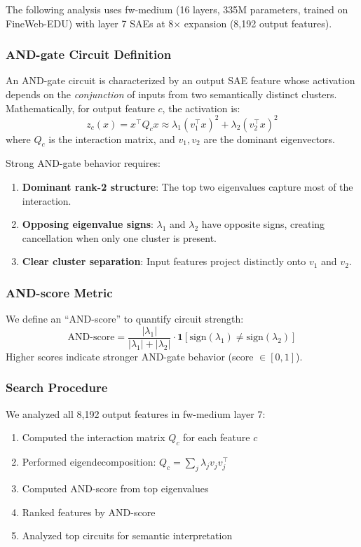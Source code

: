 The following analysis uses fw-medium (16 layers, 335M parameters, trained on FineWeb-EDU) with layer 7 SAEs at 8$\times$ expansion (8,192 output features).

\subsubsection{AND-gate Circuit Definition}
An AND-gate circuit is characterized by an output SAE feature whose activation depends on the \emph{conjunction} of inputs from two semantically distinct clusters.
Mathematically, for output feature $c$, the activation is:
\begin{equation}
z_c(x) = x^\top Q_c x \approx \lambda_1 (v_1^\top x)^2 + \lambda_2 (v_2^\top x)^2
\end{equation}
where $Q_c$ is the interaction matrix, and $v_1, v_2$ are the dominant eigenvectors.

Strong AND-gate behavior requires:
\begin{enumerate}
    \item \textbf{Dominant rank-2 structure}: The top two eigenvalues capture most of the interaction.
    \item \textbf{Opposing eigenvalue signs}: $\lambda_1$ and $\lambda_2$ have opposite signs, creating cancellation when only one cluster is present.
    \item \textbf{Clear cluster separation}: Input features project distinctly onto $v_1$ and $v_2$.
\end{enumerate}

\subsubsection{AND-score Metric}
We define an ``AND-score'' to quantify circuit strength:
\begin{equation}
\text{AND-score} = \frac{|\lambda_1|}{|\lambda_1| + |\lambda_2|} \cdot \mathbf{1}[\text{sign}(\lambda_1) \neq \text{sign}(\lambda_2)]
\end{equation}
Higher scores indicate stronger AND-gate behavior (score $\in [0, 1]$).

\subsubsection{Search Procedure}
We analyzed all 8,192 output features in fw-medium layer 7:
\begin{enumerate}
    \item Computed the interaction matrix $Q_c$ for each feature $c$
    \item Performed eigendecomposition: $Q_c = \sum_j \lambda_j v_j v_j^\top$
    \item Computed AND-score from top eigenvalues
    \item Ranked features by AND-score
    \item Analyzed top circuits for semantic interpretation
\end{enumerate}

